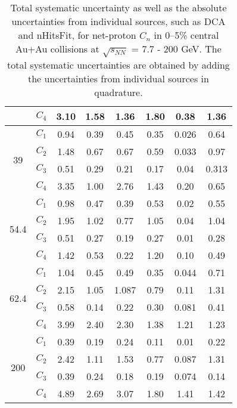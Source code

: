 \documentclass[11pt]{article}
\begin{document}
\begin{table}[]
\begin{tabular}{@{}cccccccc@{}}
                      & $C_4$ & 3.10  & 1.58 & 1.36  & 1.80 & 0.38  & 1.36  \\ \midrule
\multirow{4}{*}{39}   & $C_1$ & 0.94  & 0.39 & 0.45  & 0.35 & 0.026 & 0.64  \\
                      & $C_2$ & 1.48  & 0.67 & 0.67  & 0.59 & 0.033 & 0.97  \\
                      & $C_3$ & 0.51  & 0.29 & 0.21  & 0.17 & 0.04  & 0.313 \\
                      & $C_4$ & 3.35  & 1.00 & 2.76  & 1.43 & 0.20  & 0.65  \\ \midrule
\multirow{4}{*}{54.4} & $C_1$ &  0.98 & 0.47 & 0.39 & 0.53 & 0.02 & 0.55 \\
                      & $C_2$ &  1.95 & 1.02 & 0.77 & 1.05 & 0.04 & 1.04 \\
                      & $C_3$ &  0.51 & 0.27 & 0.19 & 0.27 & 0.01 & 0.28 \\
                      & $C_4$ &  1.42 & 0.53 & 0.22 & 1.20 & 0.10 & 0.49 \\ \midrule
\multirow{4}{*}{62.4} & $C_1$ & 1.04  & 0.45 & 0.49  & 0.35 & 0.044 & 0.71  \\
                      & $C_2$ & 2.15  & 1.05 & 1.087 & 0.79 & 0.11  & 1.31  \\
                      & $C_3$ & 0.58  & 0.14 & 0.22  & 0.30 & 0.081 & 0.41  \\
                      & $C_4$ & 3.99  & 2.40 & 2.30  & 1.38 & 1.21  & 1.23  \\ \midrule
\multirow{4}{*}{200}  & $C_1$ & 0.39  & 0.19 & 0.24  & 0.11 & 0.01  & 0.22  \\
                      & $C_2$ & 2.42  & 1.11 & 1.53  & 0.77 & 0.087 & 1.31  \\
                      & $C_3$ & 0.39  & 0.24 & 0.18  & 0.19 & 0.074 & 0.14  \\
                      & $C_4$ & 4.89  & 2.69 & 3.07  & 1.80 & 1.41  & 1.42  \\ \bottomrule
\end{tabular}
\caption{Total systematic uncertainty as well as the absolute uncertainties from individual sources, such as DCA and nHitsFit, for net-proton $C_n$ in 0–5\% central Au+Au collisions at $\sqrt{s_{NN}}$ =  7.7 - 200 GeV. The total systematic uncertainties are obtained by adding the uncertainties from individual sources in quadrature.}
\end{table}
\end{document}
